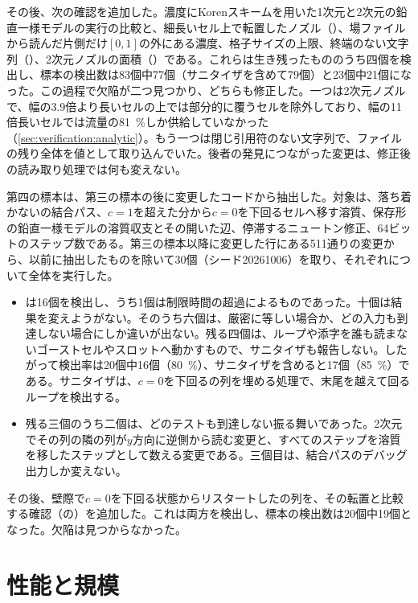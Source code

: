 その後、次の確認を追加した。濃度にKorenスキームを用いた1次元と2次元の鉛直一様モデルの実行の比較と、細長いセル上で転置したノズル（）、場ファイルから読んだ片側だけ$[0, 1]$の外にある濃度、格子サイズの上限、終端のない文字列（）、2次元ノズルの面積（）である。これらは生き残ったもののうち四個を検出し、標本の検出数は83個中77個（サニタイザを含めて79個）と23個中21個になった。この過程で欠陥が二つ見つかり、どちらも修正した。一つは2次元ノズルで、幅の3.9倍より長いセルの上では部分的に覆うセルを除外しており、幅の11倍長いセルでは流量の\SI{81}{\percent}しか供給していなかった（\cref{sec:verification:analytic}）。もう一つは閉じ引用符のない文字列で、ファイルの残り全体を値として取り込んでいた。後者の発見につながった変更は、修正後の読み取り処理では何も変えない。

第四の標本は、第三の標本の後に変更したコードから抽出した。対象は、落ち着かないの結合パス、$c = 1$を超えた分から$c = 0$を下回るセルへ移す溶質、保存形の鉛直一様モデルの溶質収支とその開いた辺、停滞するニュートン修正、64ビットのステップ数である。第三の標本以降に変更した行にある511通りの変更から、以前に抽出したものを除いて30個（シード20261006）を取り、それぞれについて全体を実行した。

\begin{itemize}
  \item {}は16個を検出し、うち1個は制限時間の超過によるものであった。十個は結果を変えようがない。そのうち六個は、厳密に等しい場合か、どの入力も到達しない場合にしか違いが出ない。残る四個は、ループや添字を誰も読まないゴーストセルやスロットへ動かすもので、サニタイザも報告しない。したがって検出率は20個中16個（\SI{80}{\percent}）、サニタイザを含めると17個（\SI{85}{\percent}）である。サニタイザは、$c = 0$を下回るの列を埋める処理で、末尾を越えて回るループを検出する。
  \item 残る三個のうち二個は、どのテストも到達しない振る舞いであった。2次元でその列の隣の列が$y$方向に逆側から読む変更と、すべてのステップを溶質を移したステップとして数える変更である。三個目は、結合パスのデバッグ出力しか変えない。
\end{itemize}

その後、壁際で$c = 0$を下回る状態からリスタートしたの列を、その転置と比較する確認（の）を追加した。これは両方を検出し、標本の検出数は20個中19個となった。欠陥は見つからなかった。

\section{性能と規模}
\label{sec:notverified:scale}

